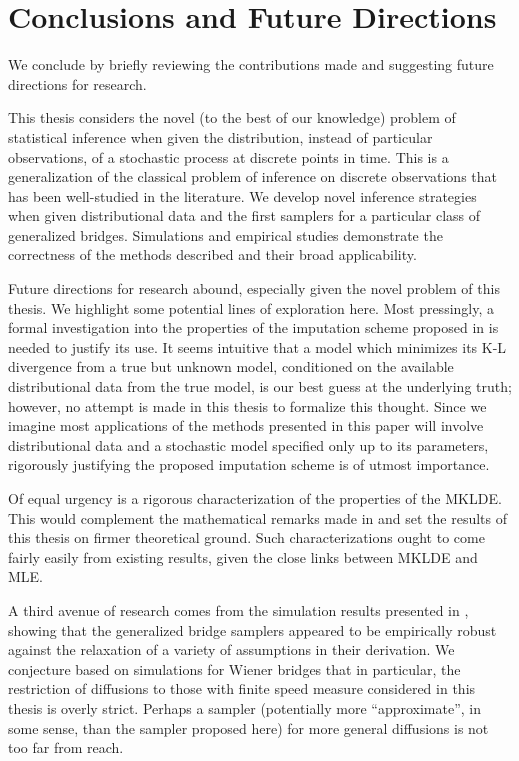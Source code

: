
\chapter{Conclusions and Future Directions\label{chap:7}}

We conclude by briefly reviewing the contributions made and suggesting
future directions for research.

This thesis considers the novel (to the best of our knowledge) problem
of statistical inference when given the distribution, instead of particular
observations, of a stochastic process at discrete points in time.
This is a generalization of the classical problem of inference on
discrete observations that has been well-studied in the literature.
We develop novel inference strategies when given distributional data
and the first samplers for a particular class of generalized bridges.
Simulations and empirical studies demonstrate the correctness of the
methods described and their broad applicability.

Future directions for research abound, especially given the novel
problem of this thesis. We highlight some potential lines of exploration
here. Most pressingly, a formal investigation into the properties
of the imputation scheme proposed in  is needed to justify
its use. It seems intuitive that a model which minimizes its K-L divergence
from a true but unknown model, conditioned on the available distributional
data from the true model, is our best guess at the underlying truth;
however, no attempt is made in this thesis to formalize this thought.
Since we imagine most applications of the methods presented in this
paper will involve distributional data and a stochastic model specified
only up to its parameters, rigorously justifying the proposed imputation
scheme is of utmost importance.

Of equal urgency is a rigorous characterization of the properties
of the MKLDE. This would complement the mathematical remarks made
in  and set the results of this thesis on firmer theoretical
ground. Such characterizations ought to come fairly easily from existing
results, given the close links between MKLDE and MLE.

A third avenue of research comes from the simulation results presented
in , showing that the generalized bridge samplers appeared
to be empirically robust against the relaxation of a variety of assumptions
in their derivation. We conjecture based on simulations for Wiener
bridges that in particular, the restriction of diffusions to those
with finite speed measure considered in this thesis is overly strict.
Perhaps a sampler (potentially more ``approximate'', in some sense,
than the sampler proposed here) for more general diffusions is not
too far from reach.

